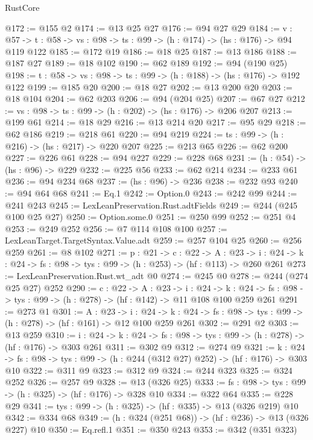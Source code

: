 \begin{lexlean}{RustCore}
\begin{coremodule}
@172 := @155 @2
@174 := @13 @25 @27
@176 := @94 @27 @29
@184 := {v : @57} ->
  {t : @58} -> {vs : @98} -> {ts : @99} -> (h : @174) -> (hs : @176) -> @94 @119 @122
@185 := @172 @19
@186 := @18 @25
@187 := @13 @186
@188 := @187 @27
@189 := @18 @102
@190 := @62 @189
@192 := @94 (@190 @25)
@198 := {t : @58} -> {vs : @98} -> {ts : @99} -> (h : @188) -> (hs : @176) -> @192 @122
@199 := @185 @20
@200 := @18 @27
@202 := @13 @200 @20
@203 := @18 @104
@204 := @62 @203
@206 := @94 (@204 @25)
@207 := @67 @27
@212 := {vs : @98} -> {ts : @99} -> (h : @202) -> (hs : @176) -> @206 @207
@213 := @199 @61
@214 := @18 @29
@216 := @13 @214 @20
@217 := @95 @29
@218 := @62 @186
@219 := @218 @61
@220 := @94 @219
@224 := {ts : @99} -> (h : @216) -> (hs : @217) -> @220 @207
@225 := @213 @65
@226 := @62 @200
@227 := @226 @61
@228 := @94 @227
@229 := @228 @68
@231 := (h : @54) -> (hs : @96) -> @229
@232 := @225 @56
@233 := @62 @214
@234 := @233 @61
@236 := @94 @234 @68
@237 := (hs : @96) -> @236
@238 := @232 @93
@240 := @94 @64 @68
@241 := Eq.{1}
@242 := Option.{0}
@243 := @242 @99
@244 := @241 @243
@245 := LexLeanPreservation.Rust.adtFields
@249 := @244 (@245 @100 @25 @27)
@250 := Option.some.{0}
@251 := @250 @99
@252 := @251 @4
@253 := @249 @252
@256 := @7 @114 @108 @100
@257 := LexLeanTarget.TargetSyntax.Value.adt
@259 := @257 @104 @25
@260 := @256 @259
@261 := @8 @102
@271 := {p : @21} ->
  {c : @22} ->
  {A : @23} ->
  {i : @24} -> {k : @24} -> {fs : @98} -> {tys : @99} -> (h : @253) -> (hf : @113) -> @260 @261
@273 := LexLeanPreservation.Rust.wt_adt @0
@274 := @245 @0
@278 := @244 (@274 @25 @27) @252
@290 := {c : @22} ->
  {A : @23} ->
  {i : @24} ->
  {k : @24} -> {fs : @98} -> {tys : @99} -> (h : @278) -> (hf : @142) -> @11 @108 @100 @259 @261
@291 := @273 @1
@301 := {A : @23} ->
  {i : @24} ->
  {k : @24} -> {fs : @98} -> {tys : @99} -> (h : @278) -> (hf : @161) -> @12 @100 @259 @261
@302 := @291 @2
@303 := @13 @259
@310 := {i : @24} ->
  {k : @24} -> {fs : @98} -> {tys : @99} -> (h : @278) -> (hf : @176) -> @303 @261
@311 := @302 @9
@312 := @274 @9
@321 := {k : @24} ->
  {fs : @98} -> {tys : @99} -> (h : @244 (@312 @27) @252) -> (hf : @176) -> @303 @10
@322 := @311 @9
@323 := @312 @9
@324 := @244 @323
@325 := @324 @252
@326 := @257 @9
@328 := @13 (@326 @25)
@333 := {fs : @98} -> {tys : @99} -> (h : @325) -> (hf : @176) -> @328 @10
@334 := @322 @64
@335 := @228 @29
@341 := {tys : @99} -> (h : @325) -> (hf : @335) -> @13 (@326 @219) @10
@342 := @334 @68
@349 := (h : @324 (@251 @68)) -> (hf : @236) -> @13 (@326 @227) @10
@350 := Eq.refl.{1}
@351 := @350 @243
@353 := @342 (@351 @323)

\end{coremodule}
\end{lexlean}
